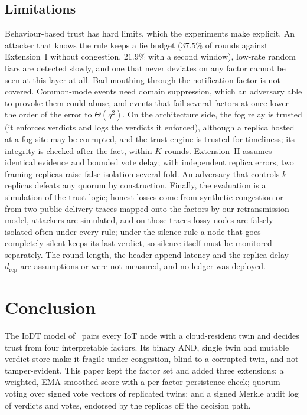 \documentclass{ieeeaccess}
\begin{document}
\subsection{Limitations}
Behaviour-based trust has hard limits, which the experiments make
explicit.  An attacker that knows the rule keeps a lie budget
($37.5\%$ of rounds against Extension~I without congestion,
$21.9\%$ with a second window), low-rate random liars are detected
slowly, and one that never deviates on any factor cannot be seen at
this layer at all.  Bad-mouthing through the notification factor is
not covered.  Common-mode events need domain suppression, which an
adversary able to provoke them could abuse, and events that fail
several factors at once lower the order of the error to
$\Theta(q^{2})$.  On the architecture side, the fog relay is trusted
(it enforces verdicts and logs the verdicts it enforced), although a
replica hosted at a fog site may be corrupted, and the trust engine is
trusted for timeliness; its integrity is checked after the fact,
within $K$ rounds.  Extension~II assumes identical evidence and
bounded vote delay; with independent replica errors, two framing
replicas raise false isolation several-fold.  An adversary that controls
$k$ replicas defeats any quorum by construction.  Finally, the
evaluation is a simulation of the trust logic; honest losses come from
synthetic congestion or from two public delivery traces mapped onto the
factors by our retransmission model, attackers are simulated, and on
those traces lossy nodes are falsely isolated often under every rule;
under the silence rule a node that goes completely silent keeps its
last verdict, so silence itself must be monitored separately.
The round length, the header append
latency and the replica delay $d_{\mathrm{rep}}$ are assumptions or
were not measured, and no ledger was deployed.
\section{Conclusion}
\label{sec:conclusion}
The IoDT model of~\cite{soula2024iodt} pairs every IoT node with a
cloud-resident twin and decides trust from four interpretable factors.
Its binary AND, single twin and mutable verdict store make it fragile
under congestion, blind to a corrupted twin, and not tamper-evident.
This paper kept the factor set and added three extensions: a weighted,
EMA-smoothed score with a per-factor persistence check; quorum voting
over signed vote vectors of replicated twins; and a signed Merkle
audit log of verdicts and votes, endorsed by the replicas off the
decision path.
\end{document}
